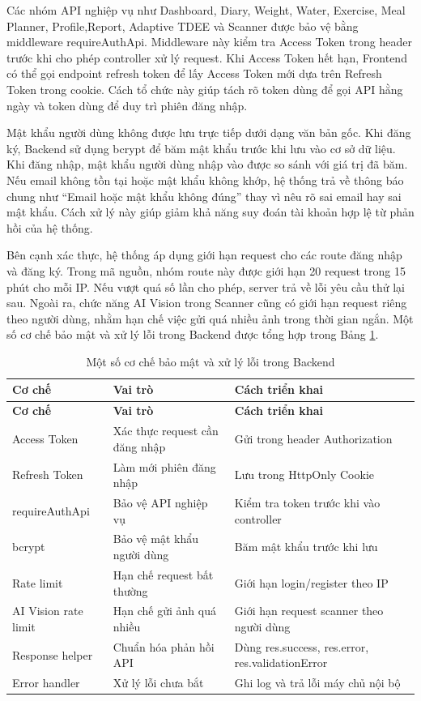 \documentclass[12pt, a4paper]{report}
\begin{document}
Các nhóm API nghiệp vụ như Dashboard, Diary, Weight, Water, Exercise, Meal Planner, Profile,Report, Adaptive TDEE và Scanner được bảo vệ bằng middleware requireAuthApi. Middleware này kiểm tra Access Token trong header trước khi cho phép controller xử lý request. Khi Access Token hết hạn, Frontend có thể gọi endpoint refresh token để lấy Access Token mới dựa trên Refresh Token trong cookie. Cách tổ chức này giúp tách rõ token dùng để gọi API hằng ngày và token dùng để duy trì phiên đăng nhập.

Mật khẩu người dùng không được lưu trực tiếp dưới dạng văn bản gốc. Khi đăng ký, Backend sử dụng bcrypt để băm mật khẩu trước khi lưu vào cơ sở dữ liệu. Khi đăng nhập, mật khẩu người dùng nhập vào được so sánh với giá trị đã băm. Nếu email không tồn tại hoặc mật khẩu không khớp, hệ thống trả về thông báo chung như “Email hoặc mật khẩu không đúng” thay vì nêu rõ sai email hay sai mật khẩu. Cách xử lý này giúp giảm khả năng suy đoán tài khoản hợp lệ từ phản hồi của hệ thống.

Bên cạnh xác thực, hệ thống áp dụng giới hạn request cho các route đăng nhập và đăng ký. Trong mã nguồn, nhóm route này được giới hạn 20 request trong 15 phút cho mỗi IP. Nếu vượt quá số lần cho phép, server trả về lỗi yêu cầu thử lại sau. Ngoài ra, chức năng AI Vision trong Scanner cũng có giới hạn request riêng theo người dùng, nhằm hạn chế việc gửi quá nhiều ảnh trong thời gian ngắn. Một số cơ chế bảo mật và xử lý lỗi trong Backend được tổng hợp trong Bảng \ref{tab:bao_mat_xu_ly_loi}.

\begin{longtable}{|>{\raggedright\arraybackslash}p{4cm}|>{\raggedright\arraybackslash}p{4cm}|p{7cm}|}
\caption{Một số cơ chế bảo mật và xử lý lỗi trong Backend}
\label{tab:bao_mat_xu_ly_loi} \\
\hline
\textbf{Cơ chế} & \textbf{Vai trò} & \textbf{Cách triển khai} \\
\hline
\endfirsthead
\hline
\textbf{Cơ chế} & \textbf{Vai trò} & \textbf{Cách triển khai} \\
\hline
\endhead

Access Token & Xác thực request cần đăng nhập & Gửi trong header Authorization \\
\hline
Refresh Token & Làm mới phiên đăng nhập & Lưu trong HttpOnly Cookie \\
\hline
requireAuthApi & Bảo vệ API nghiệp vụ & Kiểm tra token trước khi vào controller \\
\hline
bcrypt & Bảo vệ mật khẩu người dùng & Băm mật khẩu trước khi lưu \\
\hline
Rate limit & Hạn chế request bất thường & Giới hạn login/register theo IP \\
\hline
AI Vision rate limit & Hạn chế gửi ảnh quá nhiều & Giới hạn request scanner theo người dùng \\
\hline
Response helper & Chuẩn hóa phản hồi API & Dùng res.success, res.error, res.validationError \\
\hline
Error handler & Xử lý lỗi chưa bắt & Ghi log và trả lỗi máy chủ nội bộ \\
\hline
\end{longtable}
\end{document}
